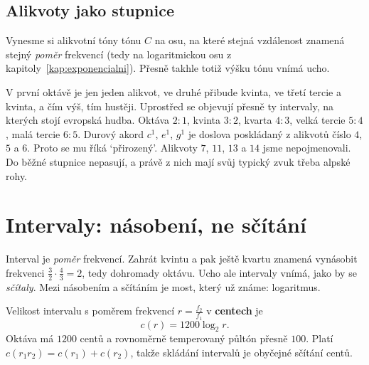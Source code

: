 \subsection*{Alikvoty jako stupnice}

Vynesme si alikvotní tóny tónu $C$ na osu, na které stejná vzdálenost znamená stejný \textit{poměr} frekvencí (tedy na logaritmickou osu z kapitoly~\ref{kap:exponencialni}). Přesně takhle totiž výšku tónu vnímá ucho.

\begin{center}
\end{center}

V první oktávě je jen jeden alikvot, ve druhé přibude kvinta, ve třetí tercie a kvinta, a čím výš, tím hustěji. Uprostřed se objevují přesně ty intervaly, na kterých stojí evropská hudba. Oktáva $2:1$, kvinta $3:2$, kvarta $4:3$, velká tercie $5:4$, malá tercie $6:5$. Durový akord $c^1$, $e^1$, $g^1$ je doslova poskládaný z alikvotů číslo $4$, $5$ a $6$. Proto se mu říká `přirozený'. Alikvoty $7$, $11$, $13$ a $14$ jsme nepojmenovali. Do běžné stupnice nepasují, a právě z nich mají svůj typický zvuk třeba alpské rohy.

\section{Intervaly: násobení, ne sčítání}

Interval je \textit{poměr} frekvencí. Zahrát kvintu a pak ještě kvartu znamená vynásobit frekvenci $\frac{3}{2}\cdot\frac{4}{3} = 2$, tedy dohromady oktávu. Ucho ale intervaly vnímá, jako by se \textit{sčítaly}. Mezi násobením a sčítáním je most, který už známe: logaritmus.

\begin{definitionbox}
  Velikost intervalu s poměrem frekvencí $r = \frac{f_2}{f_1}$ v \textbf{centech} je
  \begin{equation*}
    c(r) = 1200\log_2 r.
  \end{equation*}
  Oktáva má $1200$ centů a rovnoměrně temperovaný půltón přesně $100$. Platí $c(r_1r_2) = c(r_1) + c(r_2)$, takže skládání intervalů je obyčejné sčítání centů.
\end{definitionbox}

